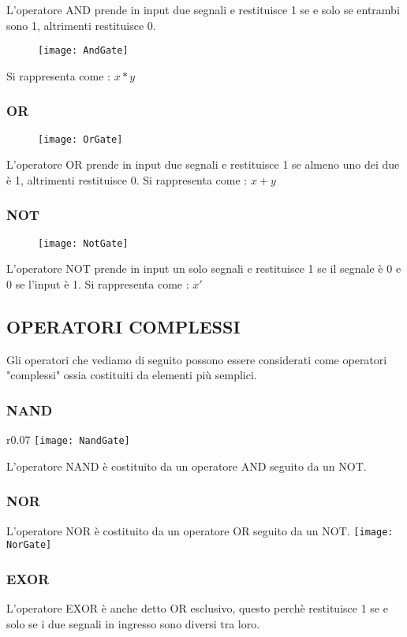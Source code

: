 \documentclass{book}
\begin{document}
L'operatore AND prende in input  due segnali e restituisce 1 se e solo se entrambi sono 1, altrimenti restituisce 0.
\begin{figure}[h!,right]
\texttt{[image: AndGate]}
\end{figure}
\newline Si rappresenta come : \(x*y\)\newline
\subsubsection*{OR}
\begin{figure}[h!]
\texttt{[image: OrGate]}
\end{figure}
L'operatore OR prende in input due segnali e restituisce 1 se almeno uno dei due è 1, altrimenti restituisce 0.
\newline Si rappresenta come : \(x+y\)\newline
\subsubsection*{NOT}
\begin{figure}[h!]
\texttt{[image: NotGate]}
\end{figure}
L'operatore NOT prende in input un solo segnali e restituisce 1 se il segnale è 0 e 0 se l'input è 1.
\newline Si rappresenta come : \(x'\)

\newpage
\subsection{OPERATORI COMPLESSI}
Gli operatori che vediamo di seguito possono essere considerati come operatori "complessi" ossia costituiti da elementi più semplici.
\subsubsection*{NAND}
\begin{wrapfigure}{r}{0.07\textwidth}
\texttt{[image: NandGate]}
\end{wrapfigure}
L'operatore NAND è costituito da un operatore AND seguito da un NOT.
\subsubsection*{NOR}
L'operatore NOR è costituito da un operatore OR seguito da un NOT.
\texttt{[image: NorGate]}
\subsubsection*{EXOR}
L'operatore EXOR è anche detto OR esclusivo, questo perchè restituisce 1 se e solo se i due segnali in ingresso sono diversi tra loro.
\end{document}

